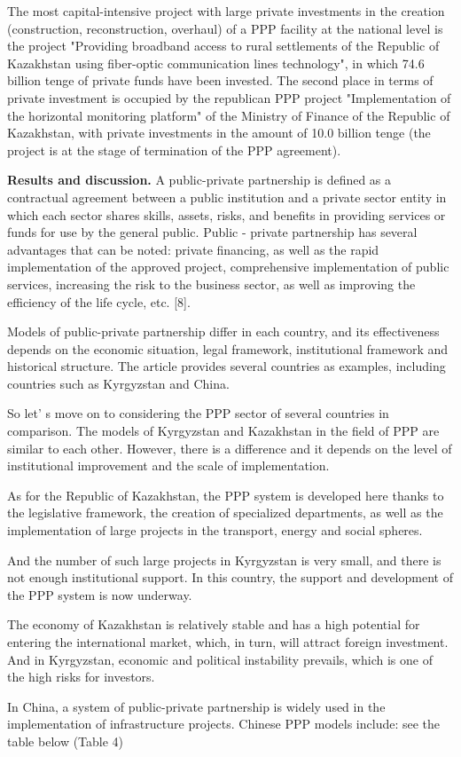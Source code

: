 \begin{multicols}{2}
The most capital-intensive project with large private investments in the
creation (construction, reconstruction, overhaul) of a PPP facility at
the national level is the project "Providing broadband access to rural
settlements of the Republic of Kazakhstan using fiber-optic
communication lines technology", in which 74.6 billion tenge of private
funds have been invested. The second place in terms of private
investment is occupied by the republican PPP project "Implementation of
the horizontal monitoring platform" of the Ministry of Finance of the
Republic of Kazakhstan, with private investments in the amount of 10.0
billion tenge (the project is at the stage of termination of the PPP
agreement).

{\bfseries Results and discussion.} A public-private partnership is defined
as a contractual agreement between a public institution and a private
sector entity in which each sector shares skills, assets, risks, and
benefits in providing services or funds for use by the general public.
Public - private partnership has several advantages that can be noted:
private financing, as well as the rapid implementation of the approved
project, comprehensive implementation of public services, increasing the
risk to the business sector, as well as improving the efficiency of the
life cycle, etc. {[}8{]}.

Models of public-private partnership differ in each country, and its
effectiveness depends on the economic situation, legal framework,
institutional framework and historical structure. The article provides
several countries as examples, including countries such as Kyrgyzstan
and China.

So let' s move on to considering the PPP sector of
several countries in comparison. The models of Kyrgyzstan and Kazakhstan
in the field of PPP are similar to each other. However, there is a
difference and it depends on the level of institutional improvement and
the scale of implementation.

As for the Republic of Kazakhstan, the PPP system is developed here
thanks to the legislative framework, the creation of specialized
departments, as well as the implementation of large projects in the
transport, energy and social spheres.

And the number of such large projects in Kyrgyzstan is very small, and
there is not enough institutional support. In this country, the support
and development of the PPP system is now underway.

The economy of Kazakhstan is relatively stable and has a high potential
for entering the international market, which, in turn, will attract
foreign investment. And in Kyrgyzstan, economic and political
instability prevails, which is one of the high risks for investors.

In China, a system of public-private partnership is widely used in the
implementation of infrastructure projects. Chinese PPP models include:
see the table below (Table 4)
\end{multicols}

